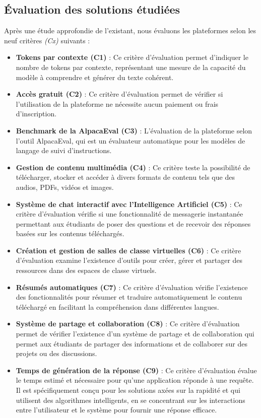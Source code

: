 \subsection{Évaluation des solutions étudiées}
Après une étude approfondie de l’existant, nous évaluons les plateformes selon les neuf critères \textit{(Cx)} suivants :
\begin{itemize}[itemsep=2pt, parsep=2pt]
    \item \textbf{Tokens par contexte (C1)} : Ce critère d’évaluation permet d’indiquer le nombre de tokens par contexte, représentant une mesure de la capacité du modèle à comprendre et générer du texte cohérent.
    \item \textbf{Accès gratuit (C2)} :  Ce critère d’évaluation permet de vérifier si l'utilisation de la plateforme ne nécessite aucun paiement ou frais d'inscription.
    \item \textbf{Benchmark de la AlpacaEval (C3)} :  L'évaluation de la plateforme selon l'outil AlpacaEval, qui est un évaluateur automatique pour les modèles de langage de suivi d'instructions.
    \item \textbf{Gestion de contenu multimédia (C4)} :  Ce critère teste la possibilité de télécharger, stocker et accéder à divers formats de contenu tels que des audios, PDFs, vidéos et images.
    \item \textbf{Système de chat interactif avec l’Intelligence Artificiel (C5)} : Ce critère d’évaluation vérifie si une fonctionnalité de messagerie instantanée permettant aux étudiants de poser des questions et de recevoir des réponses basées sur les contenus téléchargés.
    \item \textbf{Création et gestion de salles de classe virtuelles (C6)} : Ce critère d’évaluation examine l’existence d’outils pour créer, gérer et partager des ressources dans des espaces de classe virtuels.
    \item \textbf{Résumés automatiques (C7)} : Ce critère d’évaluation vérifie l’existence des fonctionnalités pour résumer et traduire automatiquement le contenu téléchargé en facilitant la compréhension dans différentes langues.
    \item \textbf{Système de partage et collaboration (C8)} : Ce critère d’évaluation permet de vérifier l’existence d’un système de partage et de collaboration qui permet aux étudiants de partager des informations et de collaborer sur des projets ou des discussions.
    \item  \textbf{Temps de génération de la réponse (C9)} : Ce critère d'évaluation évalue le temps estimé et nécessaire pour qu'une application réponde à une requête. Il est spécifiquement conçu pour les solutions axées sur la rapidité et qui utilisent des algorithmes intelligents, en se concentrant sur les interactions entre l'utilisateur et le système pour fournir une réponse efficace.
\end{itemize}

